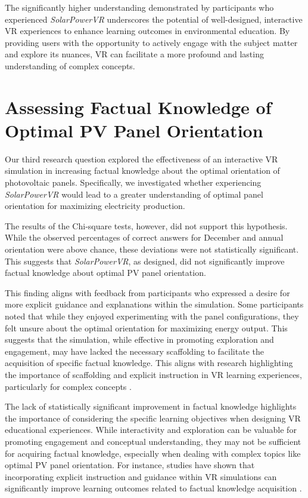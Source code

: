 \documentclass[draft, final]{vutinfth} %
\begin{document}
The significantly higher understanding demonstrated by participants who experienced \textit{SolarPowerVR} underscores the potential of well-designed, interactive VR experiences to enhance learning outcomes in environmental education. By providing users with the opportunity to actively engage with the subject matter and explore its nuances, VR can facilitate a more profound and lasting understanding of complex concepts.

\section{Assessing Factual Knowledge of Optimal PV Panel Orientation}

Our third research question explored the effectiveness of an interactive VR simulation in increasing factual knowledge about the optimal orientation of photovoltaic panels. Specifically, we investigated whether experiencing \textit{SolarPowerVR} would lead to a greater understanding of optimal panel orientation for maximizing electricity production.

The results of the Chi-square tests, however, did not support this hypothesis. While the observed percentages of correct answers for December and annual orientation were above chance, these deviations were not statistically significant. This suggests that \textit{SolarPowerVR}, as designed, did not significantly improve factual knowledge about optimal PV panel orientation.

This finding aligns with feedback from participants who expressed a desire for more explicit guidance and explanations within the simulation. Some participants noted that while they enjoyed experimenting with the panel configurations, they felt unsure about the optimal orientation for maximizing energy output. This suggests that the simulation, while effective in promoting exploration and engagement, may have lacked the necessary scaffolding to facilitate the acquisition of specific factual knowledge.  This aligns with research highlighting the importance of scaffolding and explicit instruction in VR learning experiences, particularly for complex concepts \cite{Dalgarno2010Learning, Mikropoulos2011VrEducational}.

The lack of statistically significant improvement in factual knowledge highlights the importance of considering the specific learning objectives when designing VR educational experiences. While interactivity and exploration can be valuable for promoting engagement and conceptual understanding, they may not be sufficient for acquiring factual knowledge, especially when dealing with complex topics like optimal PV panel orientation.  For instance, studies have shown that incorporating explicit instruction and guidance within VR simulations can significantly improve learning outcomes related to factual knowledge acquisition \cite{Merchant2014VrEffectiveness}.
\end{document}
